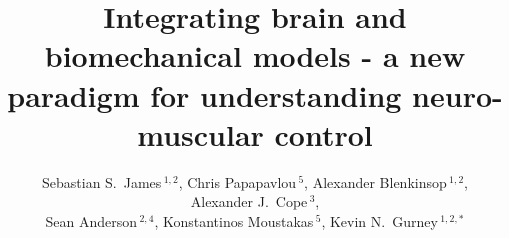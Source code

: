 \documentclass{frontiersSCNS}
\def\firstAuthorLast{James {et~al.}}
\def\Authors{Sebastian S.~James\,$^{1,2}$, Chris Papapavlou\,$^5$, Alexander Blenkinsop\,$^{1,2}$, \\
  Alexander J.~Cope\,$^3$,  \\
  Sean Anderson\,$^{2,4}$, Konstantinos Moustakas\,$^5$, Kevin N.~Gurney\,$^{1,2,*}$}
\begin{document}
\newcommand{\ccg}{Cope-Chambers} %
\newcommand{\stob}{SpineML\_2\_BRAHMS}
\newcommand{\e}{\emph}
\newcommand{\bol}{\textbf}
\newcommand{\blue}{\textcolor{blue}}
\newcommand{\mycite}[1]{\blue{\cite{#1}}}
\newcommand{\expon}{\mathrm{e}}
\newcommand{\branch}[1]{\textbf{\texttt{#1}}}
\newcommand{\cmnt}[1]{\blue{#1}}
\newcommand{\dg}{$\degree$}

\newcommand{\rvw}[1]{#1}  %
\newcommand{\rvwf}[1]{#1} %
\newcommand{\rvwt}[1]{#1} %

\onecolumn
{}

\title[Integrated brain and biomechanics]{
Integrating brain and biomechanical models - a new paradigm
for understanding  neuro-muscular control
}

\author[\firstAuthorLast ]{\Authors}
\address{}
\correspondance{}
\extraAuth{} %
\end{document}
